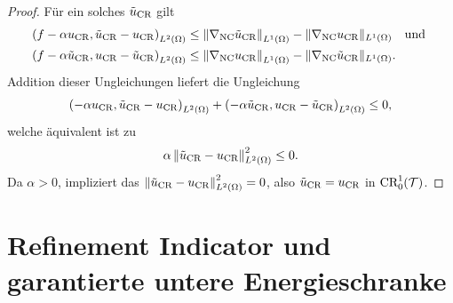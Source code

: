 \begin{proof}
  \medskip
  Für ein solches $\tilde{u}_{\textup{CR}}$ gilt
  \begin{align*}
    \left(f-\alpha u_\textup{CR},\tilde{u}_{\textup{CR}}-u_\textup{CR}\right)_{L^2(\Omega)} 
    &\leq
    \left\Vert\nabla_\textup{NC}\tilde{u}_{\textup{CR}}\right\Vert_{L^1(\Omega)}
    -\Vert\nabla_\textup{NC}u_\textup{CR}\Vert_{L^1(\Omega)}\quad\text{und }\\
    \left(f-\alpha\tilde{u}_{\textup{CR}},u_\textup{CR}-\tilde{u}_{\textup{CR}}\right)_{L^2(\Omega)} 
    &\leq
    \left\Vert\nabla_\textup{NC}u_\textup{CR}\right\Vert_{L^1(\Omega)}
    -\Vert\nabla_\textup{NC}\tilde{u}_{\textup{CR}}\Vert_{L^1(\Omega)}. 
  \end{align*}
  Addition dieser Ungleichungen
  liefert die Ungleichung
  \begin{align*}
    \left(-\alpha u_\textup{CR},\tilde{u}_{\textup{CR}}-u_\textup{CR}\right)_{L^2(\Omega)} 
    + \left(-\alpha\tilde{u}_{\textup{CR}},u_\textup{CR}-\tilde{u}_{\textup{CR}}\right)_{L^2(\Omega)} 
    \leq
    0,
  \end{align*}
  welche äquivalent ist zu
  \begin{align*}
    \alpha\left\Vert\tilde{u}_{\textup{CR}}-u_\textup{CR}\right\Vert_{L^2(\Omega)}^2
    \leq
    0.
  \end{align*}
  Da $\alpha>0$, impliziert das
  $\left\Vert\tilde{u}_{\textup{CR}}-u_\textup{CR}\right\Vert_{L^2(\Omega)}^2=0$, also
  $\tilde{u}_{\textup{CR}}=u_\textup{CR}$ in $\textup{CR}^1_0(\mathcal{T})$.
\end{proof}

\section{Refinement Indicator und garantierte untere Energieschranke}
